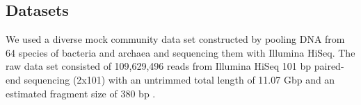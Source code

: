 \documentclass[10pt,a4paper,twocolumn]{article}
\begin{document}







 

\subsection*{Datasets}

We used a diverse mock community data set constructed by pooling DNA
from 64 species of bacteria and archaea and sequencing them with
Illumina HiSeq.  The raw data set consisted of 109,629,496 reads from
Illumina HiSeq 101 bp paired-end sequencing (2x101) with an untrimmed
total length of 11.07 Gbp and an estimated fragment size of 380 bp
\cite{podar}.
 
\end{document}
